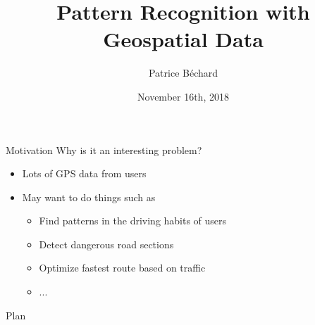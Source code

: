 \documentclass[aspectratio=169]{beamer}
\author{Patrice B\'echard}
\institute[Intact]{
\small{Intact Data Lab} \\
\textit{patrice.bechard@intact.net}
}
\title{Pattern Recognition with Geospatial Data}
\date{November 16th, 2018}
\begin{document}

\begin{frame}[plain, t]
  \titlepage
\end{frame}


\begin{frame}{Motivation}
\centering
{\Large Why is it an interesting problem?}
\vspace{.5cm}

\begin{itemize}
    \item Lots of GPS data from users
    \item May want to do things such as
    \begin{itemize}
        \item Find patterns in the driving habits of users
        \item Detect dangerous road sections
        \item Optimize fastest route based on traffic
        \item ...
    \end{itemize}
\end{itemize}
    
\end{frame}


\begin{frame}{Plan}
  \tableofcontents
\end{frame}

\end{document}

